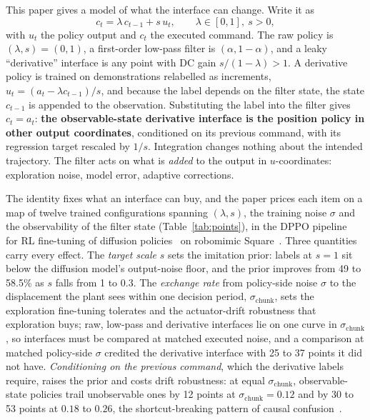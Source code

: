\documentclass{article}
\newcommand{\schunk}{\sigma_{\mathrm{chunk}}}
\begin{document}
This paper gives a model of what the interface can change. Write it as
\begin{equation}
c_t=\lambda\,c_{t-1}+s\,u_t,\qquad \lambda\in[0,1],\ s>0,
\label{eq:filter}
\end{equation}
with $u_t$ the policy output and $c_t$ the executed command. The raw policy is $(\lambda,s)=(0,1)$, a first-order low-pass filter is $(\alpha,1-\alpha)$, and a leaky ``derivative'' interface is any point with DC gain $s/(1-\lambda)>1$. A derivative policy is trained on demonstrations relabelled as increments, $u_t=(a_t-\lambda c_{t-1})/s$, and because the label depends on the filter state, the state $c_{t-1}$ is appended to the observation. Substituting the label into the filter gives $c_t=a_t$: \textbf{the observable-state derivative interface is the position policy in other output coordinates}, conditioned on its previous command, with its regression target rescaled by $1/s$. Integration changes nothing about the intended trajectory. The filter acts on what is \emph{added} to the output in $u$-coordinates: exploration noise, model error, adaptive corrections.

The identity fixes what an interface can buy, and the paper prices each item on a map of twelve trained configurations spanning $(\lambda,s)$, the training noise $\sigma$ and the observability of the filter state (Table~\ref{tab:points}), in the DPPO pipeline~\citep{ren2024diffusionpolicypolicyoptimization} for RL fine-tuning of diffusion policies~\citep{chi2023diffusionpolicy} on robomimic Square~\citep{mandlekar2021robomimic}. Three quantities carry every effect. The \emph{target scale} $s$ sets the imitation prior: labels at $s=1$ sit below the diffusion model's output-noise floor, and the prior improves from 49 to 58.5\% as $s$ falls from 1 to 0.3. The \emph{exchange rate} from policy-side noise $\sigma$ to the displacement the plant sees within one decision period, $\schunk$, sets the exploration fine-tuning tolerates and the actuator-drift robustness that exploration buys; raw, low-pass and derivative interfaces lie on one curve in $\schunk$, so interfaces must be compared at matched executed noise, and a comparison at matched policy-side $\sigma$ credited the derivative interface with 25 to 37 points it did not have. \emph{Conditioning on the previous command}, which the derivative labels require, raises the prior and costs drift robustness: at equal $\schunk$, observable-state policies trail unobservable ones by 12 points at $\schunk=0.12$ and by 30 to 53 points at $0.18$ to $0.26$, the shortcut-breaking pattern of causal confusion~\citep{dehaan2019causalconfusion,wen2020copycat}.
\end{document}
